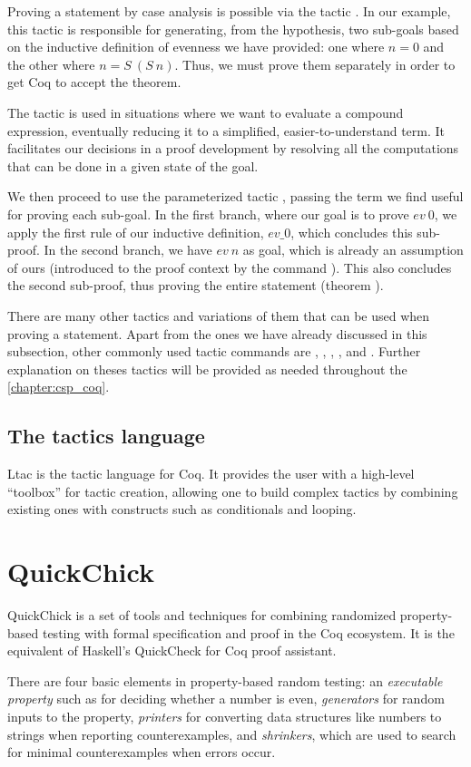 Proving a statement by case analysis is possible via the tactic . In our example, this tactic is responsible for generating, from the hypothesis, two sub-goals based on the inductive definition of evenness we have provided: one where $ n = 0 $ and the other where $ n = S \ (S \ n) $. Thus, we must prove them separately in order to get Coq to accept the theorem.

The tactic  is used in situations where we want to evaluate a compound expression, eventually reducing it to a simplified, easier-to-understand term. It facilitates our decisions in a proof development by resolving all the computations that can be done in a given state of the goal.

We then proceed to use the parameterized tactic , passing the term we find useful for proving each sub-goal. In the first branch, where our goal is to prove $ ev \ 0 $, we apply the first rule of our inductive definition, $ ev\_0 $, which concludes this sub-proof. In the second branch, we have $ ev \ n $ as goal, which is already an assumption of ours (introduced to the proof context by the command ). This also concludes the second sub-proof, thus proving the entire statement (theorem ).

There are many other tactics and variations of them that can be used when proving a statement. Apart from the ones we have already discussed in this subsection, other commonly used tactic commands are , , , ,  and . Further explanation on theses tactics will be provided as needed throughout the \autoref{chapter:csp_coq}.

\subsection{The tactics language}

Ltac is the tactic language for Coq. It provides the user with a high-level ``toolbox''  for tactic creation, allowing one to build complex tactics by combining existing ones with constructs such as conditionals and looping.

\section{QuickChick}
\label{section:quickchick}

QuickChick is a set of tools and techniques for combining randomized property-based testing with formal specification and proof in the Coq ecosystem. It is the equivalent of Haskell's QuickCheck for Coq proof assistant.

There are four basic elements in property-based random testing: an \emph{executable property} such as for deciding whether a number is even, \emph{generators} for random inputs to the property, \emph{printers} for converting data structures like numbers to strings when reporting counterexamples, and \emph{shrinkers}, which are used to search for minimal counterexamples when errors occur.

